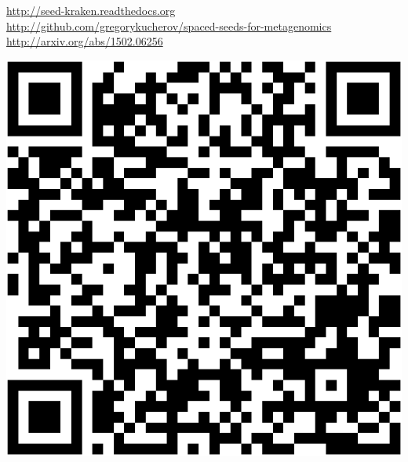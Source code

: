 \documentclass[portrait,final,a0paper,fontscale=0.277]{baposter}
\begin{document}
\begin{poster}
{ \hspace{-2.0em}
  \begin{minipage}{\textwidth}
  \begin{minipage}{0.80\linewidth}
   {\smaller \url{http://seed-kraken.readthedocs.org} \\
  \url{http://github.com/gregorykucherov/spaced-seeds-for-metagenomics}\\
  \url{http://arxiv.org/abs/1502.06256}
   }
  \end{minipage}\hfill%
  \begin{minipage}{0.20\linewidth}
  \hfill\includegraphics[width=\linewidth]{images/qr-github-com-crop.pdf}
  \end{minipage}
  \end{minipage}
   \vspace{0.3em}
  }



\end{poster}
\end{document}
